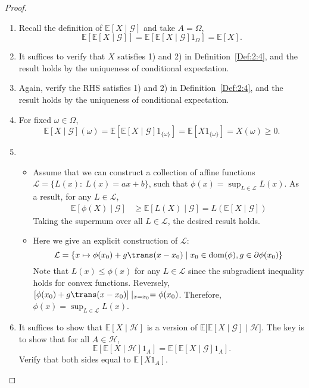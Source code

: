 \begin{proof}
\begin{enumerate}
\item
Recall the definition of $\mathbb{E}[X\mid\mathcal{G}]$ and take $A=\Omega$,
\[
\mathbb{E}[\mathbb{E}[X\mid\mathcal{G}]]=
\mathbb{E}[\mathbb{E}[X\mid\mathcal{G}]1_{\Omega}] = \mathbb{E}[X].
\]
\item
It suffices to verify that $X$ satisfies 1) and 2) in Definition~\ref{Def:2:4}, and the result holds by the uniqueness of conditional expectation.
\item
Again, verify the RHS satisfies 1) and 2) in Definition~\ref{Def:2:4}, and the result holds by the uniqueness of conditional expectation.
\item
For fixed $\omega\in\Omega$,
\[
\mathbb{E}[X\mid\mathcal{G}](\omega)
=
\mathbb{E}[\mathbb{E}[X\mid\mathcal{G}]1_{\{\omega\}}]=
\mathbb{E}[X1_{\{\omega\}}]=X(\omega)\ge0.
\]
\item
\begin{itemize}
\item
Assume that we can construct a collection of affine functions $\mathcal{L}=\{L(x):~L(x)=ax+b\}$, such that $\phi(x)=\sup_{L\in\mathcal{L}}L(x)$.
As a result, for any $L\in\mathcal{L}$,
\begin{align*}
\mathbb{E}[\phi(X)\mid\mathcal{G}]
&\ge \mathbb{E}[L(X)\mid\mathcal{G}]=L(\mathbb{E}[X\mid\mathcal{G}])
\end{align*}
Taking the supermum over all $L\in\mathcal{L}$, the desired result holds.
\item
Here we give an explicit construction of $\mathcal{L}$:
\[
\mathcal{L} = \{x\mapsto \phi(x_0)+g\trans(x-x_0)\mid x_0\in\text{dom}(\phi), g\in\partial\phi(x_0)\}
\]
Note that $L(x)\le\phi(x)$ for any $L\in\mathcal{L}$ since the subgradient inequality holds for convex functions. Reversely, $[\phi(x_0)+g\trans(x-x_0)]\mid_{x=x_0}=\phi(x_0)$.
Therefore, $\phi(x)=\sup_{L\in\mathcal{L}}L(x)$.
\end{itemize}
\item
It suffices to show that $\mathbb{E}[X\mid\mathcal{H}]$ is a version of $\mathbb{E}\bigg[
\mathbb{E}[X\mid\mathcal{G}]\mid\mathcal{H}
\bigg]$.
The key is to show that for all $A\in\mathcal{H}$, 
\[
\mathbb{E}[\mathbb{E}[X\mid\mathcal{H}]1_A] 
=\mathbb{E}[\mathbb{E}[X\mid\mathcal{G}]1_A].
\]
Verify that both sides equal to $\mathbb{E}[X 1_A]$.
%

\end{enumerate}
\end{proof}
